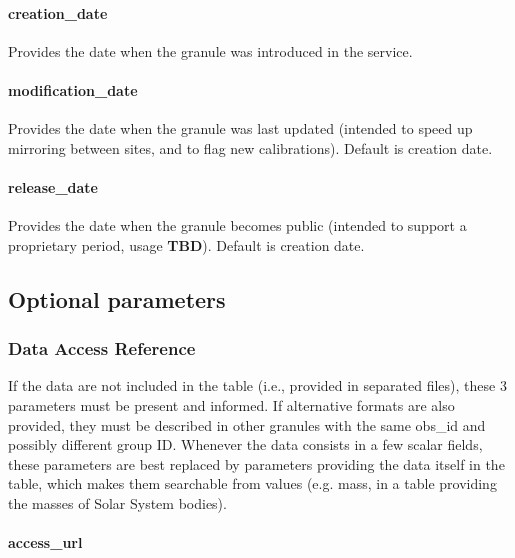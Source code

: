 \documentclass[11pt,a4paper]{ivoa}
\begin{document}
\paragraph{creation\_date}

Provides the date when the granule was introduced in the service.

\paragraph{modification\_date}

Provides the date when the granule was last updated (intended to speed up mirroring between sites, and to flag new calibrations). Default is creation date.

\paragraph{release\_date}

Provides the date when the granule becomes public (intended to support a proprietary period, usage \textbf{TBD}). Default is creation date.

\subsection{Optional parameters}

\subsubsection{Data Access Reference}

If the data are not included in the table (i.e., provided in separated files), these 3 parameters must be present and informed. If alternative formats are also provided, they must be described in other granules with the same obs\_id and possibly different group ID. Whenever the data consists in a few scalar fields, these parameters are best replaced by parameters providing the data itself in the table, which makes them searchable from values (e.g. mass, in a table providing the masses of Solar System bodies).

\paragraph{access\_url}
\end{document}

